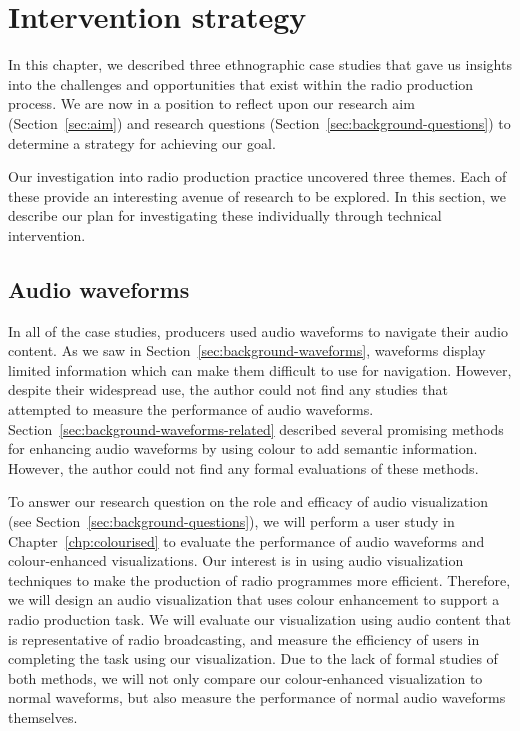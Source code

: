 \clearpage
\section{Intervention strategy}\label{sec:ethno-strategy}

In this chapter, we described three ethnographic case studies that gave us insights into the challenges and
opportunities that exist within the radio production process.  We are now in a position to reflect upon our research
aim (Section~\ref{sec:aim}) and research questions (Section~\ref{sec:background-questions}) to determine a strategy for
achieving our goal.

Our investigation into radio production practice uncovered three themes. Each of these provide an interesting avenue
of research to be explored. In this section, we describe our plan for investigating these individually through
technical intervention.

\subsection{Audio waveforms}

In all of the case studies, producers used audio waveforms to navigate their audio content.  As we saw in
Section~\ref{sec:background-waveforms}, waveforms display limited information which can make them difficult to use for
navigation.  However, despite their widespread use, the author could not find any studies that attempted to measure the
performance of audio waveforms.  Section~\ref{sec:background-waveforms-related} described several promising methods for
enhancing audio waveforms by using colour to add semantic information. However, the author could not find any formal
evaluations of these methods.

To answer our research question on the role and efficacy of audio visualization (see
Section~\ref{sec:background-questions}), we will perform a user study in Chapter~\ref{chp:colourised} to evaluate the
performance of audio waveforms and colour-enhanced visualizations. Our interest is in using audio visualization
techniques to make the production of radio programmes more efficient.  Therefore, we will design an audio visualization
that uses colour enhancement to support a radio production task.  We will evaluate our visualization using audio
content that is representative of radio broadcasting, and measure the efficiency of users in completing the task using
our visualization. Due to the lack of formal studies of both methods, we will not only compare our colour-enhanced
visualization to normal waveforms, but also measure the performance of normal audio waveforms themselves.

